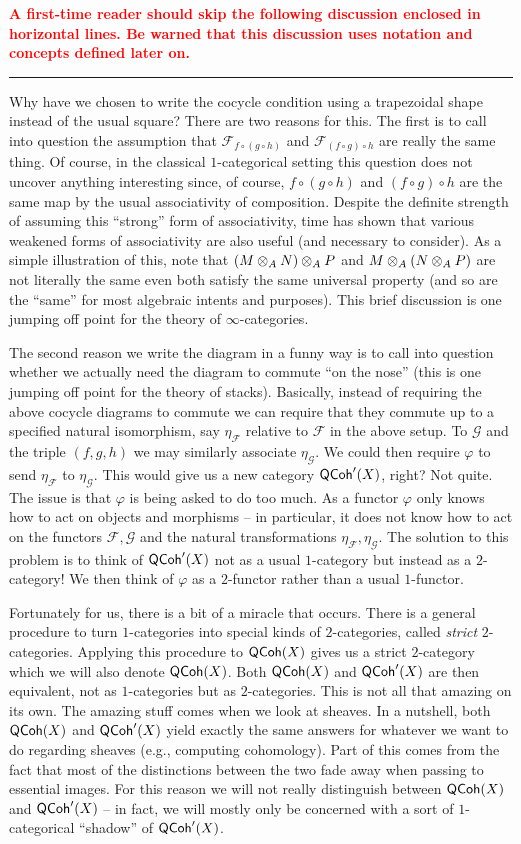 \documentclass[11pt]{article}
\renewcommand{\F}{\mathcal{F}}
\newcommand{\G}{\mathcal{G}}
\renewcommand{\phi}{\varphi}
\begin{document}
\textbf{\textcolor{red}{A first-time reader should skip the following discussion enclosed in horizontal lines. Be warned that this discussion uses notation and concepts defined later on.}}

\hrule

Why have we chosen to write the cocycle condition using a trapezoidal shape instead of the usual square? There are two reasons for this. The first is to call into question the assumption that $\F_{f\circ(g\circ h)}$ and $\F_{(f\circ g)\circ h}$ are really the same thing. Of course, in the classical $1$-categorical setting this question does not uncover anything interesting since, of course, $f\circ(g\circ h)$ and $(f\circ g)\circ h$ are the same map by the usual associativity of composition. Despite the definite strength of assuming this ``strong'' form of associativity, time has shown that various weakened forms of associativity are also useful (and necessary to consider). As a simple illustration of this, note that $(M\otimes_AN)\otimes_AP$ and $M\otimes_A(N\otimes_AP)$ are not literally the same even both satisfy the same universal property (and so are the ``same'' for most algebraic intents and purposes). This brief discussion is one jumping off point for the theory of $\infty$-categories.

The second reason we write the diagram in a funny way is to call into question whether we actually need the diagram to commute ``on the nose'' (this is one jumping off point for the theory of stacks). Basically, instead of requiring the above cocycle diagrams to commute we can require that they commute up to a specified natural isomorphism, say $\eta_{\F}$ relative to $\F$ in the above setup. To $\G$ and the triple $(f,g,h)$ we may similarly associate $\eta_{\G}$. We could then require $\phi$ to send $\eta_{\F}$ to $\eta_{\G}$. This would give us a new category $\operatorname{\mathsf{QCoh}}'(X)$, right? Not quite. The issue is that $\phi$ is being asked to do too much. As a functor $\phi$ only knows how to act on objects and morphisms -- in particular, it does not know how to act on the functors $\F,\G$ and the natural transformations $\eta_{\F},\eta_{\G}$. The solution to this problem is to think of $\operatorname{\mathsf{QCoh}}'(X)$ not as a usual $1$-category but instead as a $2$-category! We then think of $\phi$ as a $2$-functor rather than a usual $1$-functor.

Fortunately for us, there is a bit of a miracle that occurs. There is a general procedure to turn $1$-categories into special kinds of $2$-categories, called \emph{strict} $2$-categories. Applying this procedure to $\operatorname{\mathsf{QCoh}}(X)$ gives us a strict $2$-category which we will also denote $\operatorname{\mathsf{QCoh}}(X)$. Both $\operatorname{\mathsf{QCoh}}(X)$ and $\operatorname{\mathsf{QCoh}}'(X)$ are then equivalent, not as $1$-categories but as $2$-categories. This is not all that amazing on its own. The amazing stuff comes when we look at sheaves. In a nutshell, both $\operatorname{\mathsf{QCoh}}(X)$ and $\operatorname{\mathsf{QCoh}}'(X)$ yield exactly the same answers for whatever we want to do regarding sheaves (e.g., computing cohomology). Part of this comes from the fact that most of the distinctions between the two fade away when passing to essential images. For this reason we will not really distinguish between $\operatorname{\mathsf{QCoh}}(X)$ and $\operatorname{\mathsf{QCoh}}'(X)$ -- in fact, we will mostly only be concerned with a sort of $1$-categorical ``shadow'' of $\operatorname{\mathsf{QCoh}}'(X)$.
\end{document}

